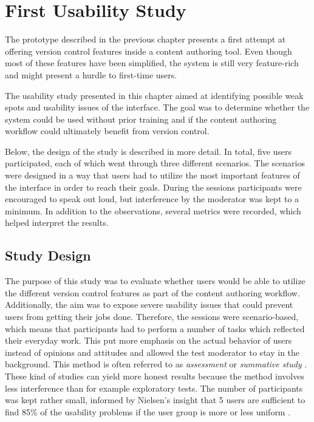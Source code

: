 \chapter{First Usability Study} \label{chapter:first-iteration}
The prototype described in the previous chapter presents a first attempt at offering version control features inside a content authoring tool. Even though most of these features have been simplified, the system is still very feature-rich and might present a hurdle to first-time users.

The usability study presented in this chapter aimed at identifying possible weak spots and usability issues of the interface. The goal was to determine whether the system could be used without prior training and if the content authoring workflow could ultimately benefit from version control.

Below, the design of the study is described in more detail. In total, five users participated, each of which went through three different scenarios. The scenarios were designed in a way that users had to utilize the most important features of the interface in order to reach their goals. During the sessions  participants were encouraged to speak out loud, but interference by the moderator was kept to a minimum. In addition to the observations, several metrics were recorded, which helped interpret the results.

\section{Study Design}
The purpose of this study was to evaluate whether users would be able to utilize the different version control features as part of the content authoring workflow. Additionally, the aim was to expose severe usability issues that could prevent users from getting their jobs done. Therefore, the sessions were scenario-based, which means that participants had to perform a number of tasks which reflected their everyday work. This put more emphasis on the actual behavior of users instead of opinions and attitudes and allowed the test moderator to stay in the background. This method is often referred to as \textit{assessment} or \textit{summative study} \cite{rubin_handbook_2008,goodman_observing_2012}. These kind of studies can yield more honest results because the method involves less interference than for example exploratory tests. The number of participants was kept rather small, informed by Nielsen's insight that 5 users are sufficient to find 85\% of the usability problems if the user group is more or less uniform \cite{nielsen_why_2000}.

